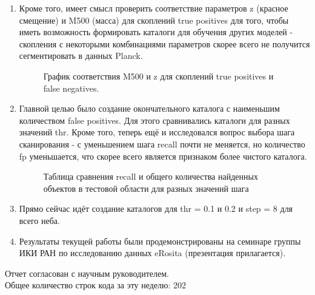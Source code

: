 \documentclass{article}
\begin{document}
\begin{enumerate}
    \item Кроме того, имеет смысл проверить соответствие параметров z (красное смещение) и M500 
        (масса) для скоплений true positives для того, чтобы иметь возможность формировать каталоги 
        для обучения других моделей - скопления с некоторыми комбинациями параметров скорее всего не 
        получится сегментировать в данных Planck.\\

    \begin{figure}[h]
        \caption{График соответствия M500 и z для скоплений true positives и false negatives.}
    \end{figure}

    \item Главной целью было создание окончательного каталога с наименьшим количеством false 
        positives. Для этого сравнивались каталоги для разных значений thr. Кроме того, теперь 
        ещё и исследовался вопрос выбора шага сканирования - с уменьшением шага recall почти не 
        меняется, но количество fp уменьшается, что скорее всего является признаком более чистого 
        каталога.\\

    
    \begin{figure}[h]
        \caption{Таблица сравнения recall и общего количества найденных объектов в тестовой области
        для разных значений шага}
    \end{figure}

    \item Прямо сейчас идёт создание каталогов для thr = 0.1 и 0.2 и step = 8 для всего неба.\\ 
    \item Результаты текущей работы были продемонстрированы на семинаре группы ИКИ РАН по исследованию 
        данных eRosita (презентация прилагается). \\ 

\end{enumerate}

Отчет согласован с научным руководителем.\\
Общее количество строк кода за эту неделю: 202\\
\end{document}
